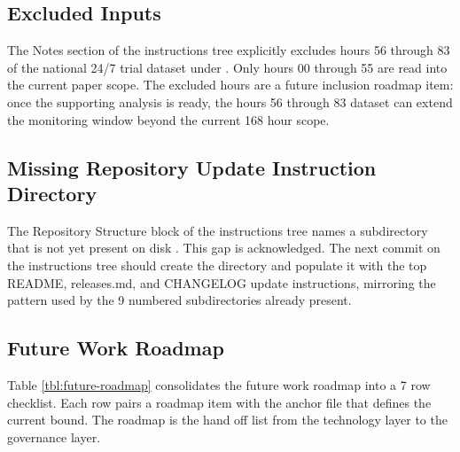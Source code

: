 \begin{sectionaccent}
\subsection{Excluded Inputs}
\label{sec:limits-excluded}

The Notes section of the instructions tree explicitly excludes hours
56 through 83 of the national 24/7 trial dataset under
\cite{kawchak_2026_humanoid_instructions,
kawchak_2026_physical_ai_oncology_trials_repo}. Only hours 00
through 55 are read into the current paper scope. The excluded
hours are a future inclusion roadmap item: once the supporting
analysis is ready, the hours 56 through 83 dataset can extend the
monitoring window beyond the current 168 hour scope.

\subsection{Missing Repository Update Instruction Directory}
\label{sec:limits-missing}

The Repository Structure block of the instructions tree names a
 subdirectory that is not yet
present on disk \cite{kawchak_2026_humanoid_instructions}. This gap
is acknowledged. The next commit on the instructions tree should
create the directory and populate it with the top README,
releases.md, and CHANGELOG update instructions, mirroring the
pattern used by the 9 numbered subdirectories already present.

\subsection{Future Work Roadmap}
\label{sec:limits-roadmap}

Table \ref{tbl:future-roadmap} consolidates the future work roadmap
into a 7 row checklist. Each row pairs a roadmap item with the
anchor file that defines the current bound. The roadmap is the
hand off list from the technology layer to the governance layer.


\end{sectionaccent}
